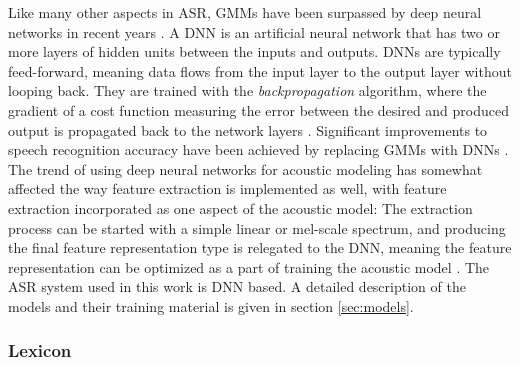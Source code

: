 \documentclass[english, 12pt, a4paper, pdftex, elec, utf8]{aaltothesis}
\begin{document}
Like many other aspects in ASR, GMMs have been surpassed by deep neural networks in recent years \cite{hinton2012deep}. A DNN is an artificial neural network that has two or more layers of hidden units between the inputs and outputs. DNNs are typically feed-forward, meaning data flows from the input layer to the output layer without looping back. They are trained with the \textit{backpropagation} algorithm, where the gradient of a cost function measuring the error between the desired and produced output is propagated back to the network layers \cite[p.~57--60]{yu2014automatic}. Significant improvements to speech recognition accuracy have been achieved by replacing GMMs with DNNs \cite{yu2014automatic, hinton2012deep, xiong2016achieving}. The trend of using deep neural networks for acoustic modeling has somewhat affected the way feature extraction is implemented as well, with feature extraction incorporated as one aspect of the acoustic model: The extraction process can be started with a simple linear or mel-scale spectrum, and producing the final feature representation type is relegated to the DNN, meaning the feature representation can be optimized as a part of training the acoustic model \cite{kallasjoki2016}. The ASR system used in this work is DNN based. A detailed description of the models and their training material is given in section \ref{sec:models}.

\subsubsection{Lexicon}
\end{document}
